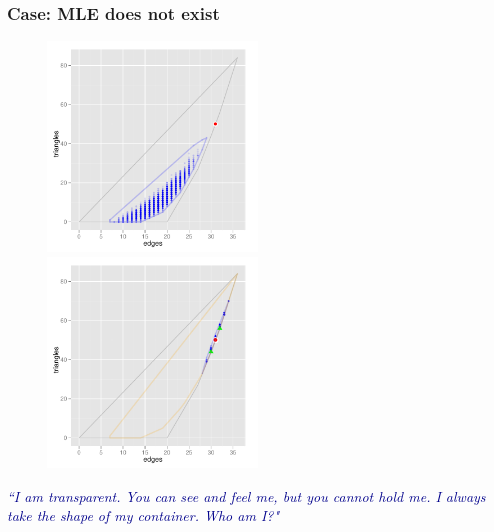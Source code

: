 \documentclass[ 10pt]{beamer}
\newcommand{\yobs}{y_{\text{obs}}}
\begin{document}
\frame
{
\frametitle{Case: MLE does not exist}  
\begin{figure}[h]
\centering
\includegraphics[height=2.2in]{MCsample-boundary}
\includegraphics[height=2.2in]{MCsample-77face}
\label{F:MCsample-MLE nonexistent}
\end{figure}
\pause
\textcolor{darkblue}{\emph{``I am transparent. You can see and feel me, but you cannot hold me. I always take the shape of my container. Who am I?"}}
}
%
%
%
\end{document}
